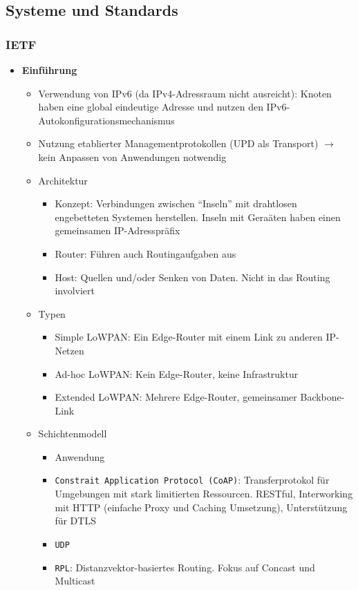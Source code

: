 \subsection{Systeme und Standards}

\subsubsection{IETF}
\begin{itemize}
	\item \textbf{Einführung}
	\begin{itemize}
		\item Verwendung von IPv6 (da IPv4-Adressraum nicht ausreicht): Knoten haben eine global eindeutige Adresse und nutzen den IPv6-Autokonfigurationsmechanismus
		\item Nutzung etablierter Managementprotokollen (UPD als Transport) \(\rightarrow\) kein Anpassen von Anwendungen notwendig
		\item Architektur
		\begin{itemize}
			\item Konzept: Verbindungen zwischen "`Inseln"' mit drahtlosen engebetteten Systemen herstellen. Inseln mit Geraäten haben einen gemeinsamen IP-Adresspräfix
			\item Router: Führen auch Routingaufgaben aus
			\item Host: Quellen und/oder Senken von Daten. Nicht in das Routing involviert
		\end{itemize}
		\item Typen
		\begin{itemize}
			\item Simple LoWPAN: Ein Edge-Router mit einem Link zu anderen IP-Netzen
			\item Ad-hoc LoWPAN: Kein Edge-Router, keine Infrastruktur
			\item Extended LoWPAN: Mehrere Edge-Router, gemeinsamer Backbone-Link
		\end{itemize}
		\item Schichtenmodell
		\begin{itemize}
			\item Anwendung
			\item \texttt{Constrait Application Protocol (CoAP)}: Transferprotokol für Umgebungen mit stark limitierten Ressourcen. RESTful, Interworking mit HTTP (einfache Proxy und Caching Umsetzung), Unterstützung für DTLS
			\item \texttt{UDP}
			\item \texttt{RPL}: Distanzvektor-basiertes Routing. Fokus auf Concast und Multicast

\end{itemize}
\end{itemize}
\end{itemize}
